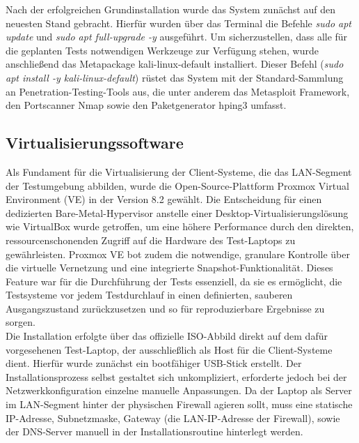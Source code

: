 Nach der erfolgreichen Grundinstallation wurde das System zunächst auf den neuesten Stand gebracht. Hierfür wurden über das Terminal die Befehle \textit{sudo apt update} und \textit{sudo apt full-upgrade -y} ausgeführt. Um sicherzustellen, dass alle für die geplanten Tests notwendigen Werkzeuge zur Verfügung stehen, wurde anschließend das Metapackage kali-linux-default installiert. Dieser Befehl (\textit{sudo apt install -y kali-linux-default}) rüstet das System mit der Standard-Sammlung an Penetration-Testing-Tools aus, die unter anderem das Metasploit Framework, den Portscanner Nmap sowie den Paketgenerator hping3 umfasst.\\


\subsection{Virtualisierungssoftware}

Als Fundament für die Virtualisierung der Client-Systeme, die das LAN-Segment der Testumgebung abbilden, wurde die Open-Source-Plattform Proxmox Virtual Environment (VE) in der Version 8.2 gewählt. Die Entscheidung für einen dedizierten Bare-Metal-Hypervisor anstelle einer Desktop-Virtualisierungslösung wie VirtualBox wurde getroffen, um eine höhere Performance durch den direkten, ressourcenschonenden Zugriff auf die Hardware des Test-Laptops zu gewährleisten. Proxmox VE bot zudem die notwendige, granulare Kontrolle über die virtuelle Vernetzung und eine integrierte Snapshot-Funktionalität. Dieses Feature war für die Durchführung der Tests essenziell, da sie es ermöglicht, die Testsysteme vor jedem Testdurchlauf in einen definierten, sauberen Ausgangszustand zurückzusetzen und so für reproduzierbare Ergebnisse zu sorgen.\\

Die Installation erfolgte über das offizielle ISO-Abbild direkt auf dem dafür vorgesehenen Test-Laptop, der ausschließlich als Host für die Client-Systeme dient. Hierfür wurde zunächst ein bootfähiger USB-Stick erstellt. Der Installationsprozess selbst gestaltet sich unkompliziert, erforderte jedoch bei der Netzwerkkonfiguration einzelne manuelle Anpassungen. Da der Laptop als Server im LAN-Segment hinter der physischen Firewall agieren sollt, muss eine statische IP-Adresse, Subnetzmaske, Gateway (die LAN-IP-Adresse der Firewall), sowie der DNS-Server manuell in der Installationsroutine hinterlegt werden.\\

